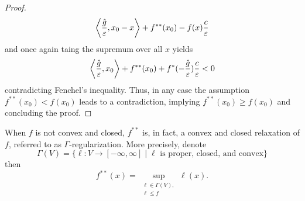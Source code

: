\begin{proof}
    \begin{equation}
        \begin{aligned}
            \left\langle\frac{\hat g}{\varepsilon} , x_0-x\right\rangle + f^{**}(x_0)-f(x)\frac{c}{\varepsilon}
        \end{aligned}
    \end{equation}
    and once again taing the supremum over all $x$ yields 
    \begin{equation}
        \begin{aligned}
            \left\langle\frac{\hat g}{\varepsilon} , x_0\right\rangle + f^{**}(x_0)+f^*(-\frac{\hat g}{\varepsilon})\frac{c}{\varepsilon}<0
        \end{aligned}
    \end{equation}
    contradicting Fenchel's inequality. Thus, in any case the assumption $f^{**}(x_0)<f(x_0)$ leads to a contradiction, implying $f^{**}(x_0)\geq f(x_0)$ and concluding the proof.
\end{proof}

\begin{rem}
    When $f$ is not convex and closed, $f^{**}$ is, in fact, a convex and closed relaxation of $f$, referred to as $\Gamma$-regularization. More precisely, denote
    \begin{equation}
        \Gamma(V)=\{\ell:V\rightarrow [-\infty,\infty]\;|\; \ell\text{ is proper, closed, and convex}\}
    \end{equation}
    then
    \begin{equation}
        f^{**}(x) = \sup_{\substack{\ell\in \Gamma(V),\\
        \ell\leq f}}\ell (x).
    \end{equation}
\end{rem}

